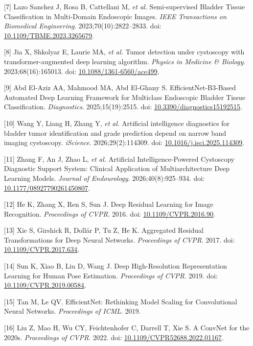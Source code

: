 \documentclass[
  10pt,
  a4paper,
  twocolumn]{article}
\begin{document}
{[}7{]} Lazo Sanchez J, Rosa B, Cattellani M, \emph{et al.}
Semi-supervised Bladder Tissue Classification in Multi-Domain Endoscopic
Images. \emph{IEEE Transactions on Biomedical Engineering}.
2023;70(10):2822--2833. doi:
\href{https://doi.org/10.1109/TBME.2023.3265679}{10.1109/TBME.2023.3265679}.

{[}8{]} Jia X, Shkolyar E, Laurie MA, \emph{et al.} Tumor detection
under cystoscopy with transformer-augmented deep learning algorithm.
\emph{Physics in Medicine \& Biology}. 2023;68(16):165013. doi:
\href{https://doi.org/10.1088/1361-6560/ace499}{10.1088/1361-6560/ace499}.

{[}9{]} Abd El-Aziz AA, Mahmood MA, Abd El-Ghany S.
EfficientNet-B3-Based Automated Deep Learning Framework for Multiclass
Endoscopic Bladder Tissue Classification. \emph{Diagnostics}.
2025;15(19):2515. doi:
\href{https://doi.org/10.3390/diagnostics15192515}{10.3390/diagnostics15192515}.

{[}10{]} Wang Y, Liang H, Zhang Y, \emph{et al.} Artificial intelligence
diagnostics for bladder tumor identification and grade prediction depend
on narrow band imaging cystoscopy. \emph{iScience}. 2026;29(2):114309.
doi:
\href{https://doi.org/10.1016/j.isci.2025.114309}{10.1016/j.isci.2025.114309}.

{[}11{]} Zhang F, An J, Zhao L, \emph{et al.} Artificial
Intelligence-Powered Cystoscopy Diagnostic Support System: Clinical
Application of Multiarchitecture Deep Learning Models. \emph{Journal of
Endourology}. 2026;40(8):925--934. doi:
\href{https://doi.org/10.1177/08927790261450807}{10.1177/08927790261450807}.

{[}12{]} He K, Zhang X, Ren S, Sun J. Deep Residual Learning for Image
Recognition. \emph{Proceedings of CVPR}. 2016. doi:
\href{https://doi.org/10.1109/CVPR.2016.90}{10.1109/CVPR.2016.90}.

{[}13{]} Xie S, Girshick R, Dollár P, Tu Z, He K. Aggregated Residual
Transformations for Deep Neural Networks. \emph{Proceedings of CVPR}.
2017. doi:
\href{https://doi.org/10.1109/CVPR.2017.634}{10.1109/CVPR.2017.634}.

{[}14{]} Sun K, Xiao B, Liu D, Wang J. Deep High-Resolution
Representation Learning for Human Pose Estimation. \emph{Proceedings of
CVPR}. 2019. doi:
\href{https://doi.org/10.1109/CVPR.2019.00584}{10.1109/CVPR.2019.00584}.

{[}15{]} Tan M, Le QV. EfficientNet: Rethinking Model Scaling for
Convolutional Neural Networks. \emph{Proceedings of ICML}. 2019.

{[}16{]} Liu Z, Mao H, Wu CY, Feichtenhofer C, Darrell T, Xie S. A
ConvNet for the 2020s. \emph{Proceedings of CVPR}. 2022. doi:
\href{https://doi.org/10.1109/CVPR52688.2022.01167}{10.1109/CVPR52688.2022.01167}.
\end{document}
